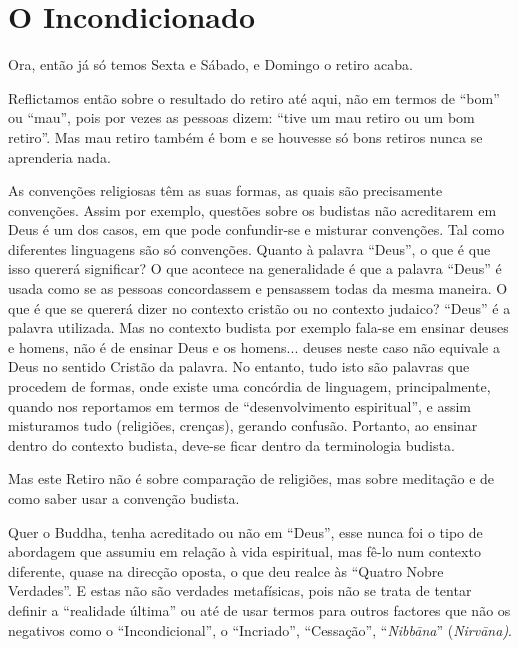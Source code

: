 \chapter{O Incondicionado}

Ora, então já só temos Sexta e Sábado, e Domingo o retiro acaba.

Reflictamos então sobre o resultado do retiro até aqui, não em termos de
``bom'' ou ``mau'', pois por vezes as pessoas dizem: ``tive um mau
retiro ou um bom retiro''. Mas mau retiro também é bom e se houvesse só
bons retiros nunca se aprenderia nada.

As convenções religiosas têm as suas formas, as quais são precisamente
convenções. Assim por exemplo, questões sobre os budistas não
acreditarem em Deus é um dos casos, em que pode confundir-se e misturar
convenções. Tal como diferentes linguagens são só convenções. Quanto à
palavra ``Deus'', o que é que isso quererá significar? O que acontece na
generalidade é que a palavra ``Deus'' é usada como se as pessoas
concordassem e pensassem todas da mesma maneira. O que é que se quererá
dizer no contexto cristão ou no contexto judaico? ``Deus'' é a palavra
utilizada. Mas no contexto budista por exemplo fala-se em ensinar deuses
e homens, não é de ensinar Deus e os homens... deuses neste caso não
equivale a Deus no sentido Cristão da palavra. No entanto, tudo isto são
palavras que procedem de formas, onde existe uma concórdia de linguagem,
principalmente, quando nos reportamos em termos de ``desenvolvimento
espiritual'', e assim misturamos tudo (religiões, crenças), gerando
confusão. Portanto, ao ensinar dentro do contexto budista, deve-se ficar
dentro da terminologia budista.

Mas este Retiro não é sobre comparação de religiões, mas sobre meditação
e de como saber usar a convenção budista.

Quer o Buddha, tenha acreditado ou não em ``Deus'', esse nunca foi o
tipo de abordagem que assumiu em relação à vida espiritual, mas fê-lo
num contexto diferente, quase na direcção oposta, o que deu realce às
``Quatro Nobre Verdades''. E estas não são verdades metafísicas, pois
não se trata de tentar definir a ``realidade última'' ou até de usar
termos para outros factores que não os negativos como o
``Incondicional'', o ``Incriado'', ``Cessação'', ``\emph{Nibbāna}''
(\emph{Nirvāna)}.

